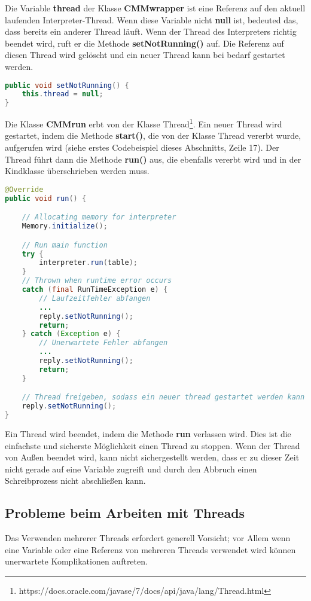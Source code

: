 Die Variable \textbf{thread} der Klasse \textbf{CMMwrapper} ist eine Referenz auf den aktuell laufenden Interpreter-Thread. Wenn diese Variable nicht \textbf{null} ist, bedeuted das, dass bereits ein anderer Thread läuft. Wenn der Thread des Interpreters richtig beendet wird, ruft er die Methode \textbf{setNotRunning()} auf. Die Referenz auf diesen Thread wird gelöscht und ein neuer Thread kann bei bedarf gestartet werden.
\begin{lstlisting}[language=JAVA]
public void setNotRunning() {
	this.thread = null;
}
\end{lstlisting}

Die Klasse \textbf{CMMrun} erbt von der Klasse Thread\footnote{https://docs.oracle.com/javase/7/docs/api/java/lang/Thread.html}. Ein neuer Thread wird gestartet, indem die Methode \textbf{start()}, die von der Klasse Thread vererbt wurde, aufgerufen wird (siehe erstes Codebeispiel dieses Abschnitts, Zeile 17). Der Thread führt dann die Methode \textbf{run()} aus, die ebenfalls vererbt wird und in der Kindklasse überschrieben werden muss.
\begin{lstlisting}[language=JAVA]
@Override
public void run() {

	// Allocating memory for interpreter
	Memory.initialize();

	// Run main function
	try {
		interpreter.run(table);
	}
	// Thrown when runtime error occurs
	catch (final RunTimeException e) {
		// Laufzeitfehler abfangen
		... 
		reply.setNotRunning();
		return;
	} catch (Exception e) {
		// Unerwartete Fehler abfangen
		...
		reply.setNotRunning();
		return;
	}

	// Thread freigeben, sodass ein neuer thread gestartet werden kann
	reply.setNotRunning();
}
\end{lstlisting}

Ein Thread wird beendet, indem die Methode \textbf{run} verlassen wird. Dies ist die einfachste und sicherste Möglichkeit einen Thread zu stoppen. Wenn der Thread von Außen beendet wird, kann nicht sichergestellt werden, dass er zu dieser Zeit nicht gerade auf eine Variable zugreift und durch den Abbruch einen Schreibprozess nicht abschließen kann.

\subsection{Probleme beim Arbeiten mit Threads}
\label{sec:deb-impl-thread-problems}
Das Verwenden mehrerer Threads erfordert generell Vorsicht; vor Allem wenn eine Variable oder eine Referenz von mehreren Threads verwendet wird können unerwartete Komplikationen auftreten.

